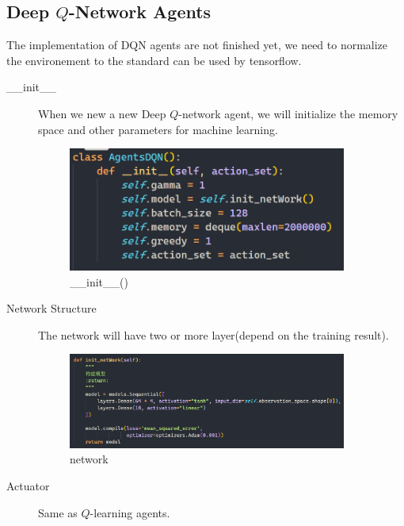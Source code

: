 \documentclass[14pt]{extarticle}
\begin{document}
\subsection{Deep $Q$-Network Agents}
The implementation of DQN agents are not finished yet, we need to normalize the environement to the standard can be used by tensorflow.
\begin{description}
    \item[\_\_init\_\_]
    When we new a new Deep $Q$-network agent, we will initialize the memory space and other parameters for machine learning. 
    \begin{figure}[H]
		\begin{center}
			\includegraphics[width=0.9\textwidth]{init_dqn.png}
			\caption{\_\_init\_\_()}
		\end{center}
	\end{figure}
    \item[Network Structure] 
    The network will have two or more layer(depend on the training result).
    \begin{figure}[H]
		\begin{center}
			\includegraphics[width=0.9\textwidth]{network.png}
			\caption{network}
		\end{center}
	\end{figure} 
    
    \item[Actuator]  
    Same as $Q$-learning agents.


\end{description}
\end{document}
